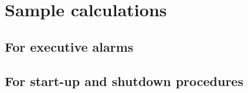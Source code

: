 \section{Sample calculations}
\label{app:samplecal}
\subsection{For executive alarms}

\subsection{For start-up and shutdown procedures}